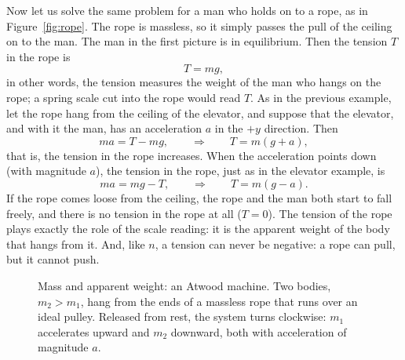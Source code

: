 \documentclass[11pt,a4paper]{article}
\begin{document}
Now let us solve the same problem for a man who holds on to a rope, as in Figure~\ref{fig:rope}.
The rope is massless, so it simply passes the pull of the ceiling on to the man. The man in the
first picture is in equilibrium. Then the tension $T$ in the rope is
\begin{equation}\label{eq:rope-rest}
  T = mg ,
\end{equation}
in other words, the tension measures the weight of the man who hangs on the rope; a spring scale
cut into the rope would read $T$. As in the previous example, let the rope hang from the ceiling of
the elevator, and suppose that the elevator, and with it the man, has an acceleration $a$ in the
$+y$ direction. Then
\begin{equation}\label{eq:rope-up}
  ma = T - mg , \qquad \Rightarrow \qquad T = m(g + a) ,
\end{equation}
that is, the tension in the rope increases. When the acceleration points down (with magnitude $a$),
the tension in the rope, just as in the elevator example, is
\begin{equation}\label{eq:rope-down}
  ma = mg - T , \qquad \Rightarrow \qquad T = m(g - a) .
\end{equation}
If the rope comes loose from the ceiling, the rope and the man both start to fall freely, and there
is no tension in the rope at all ($T = 0$). The tension of the rope plays exactly the role of the
scale reading: it is the apparent weight of the body that hangs from it. And, like $n$, a tension
can never be negative: a rope can pull, but it cannot push.

\begin{figure}[ht]
\centering
\begin{minipage}[c]{0.36\textwidth}
\centering
{}
\end{minipage}\hfill
\begin{minipage}[c]{0.6\textwidth}
\caption{Mass and apparent weight: an Atwood machine. Two bodies, $m_2 > m_1$, hang from the ends
of a massless rope that runs over an ideal pulley. Released from rest, the system turns clockwise:
$m_1$ accelerates upward and $m_2$ downward, both with acceleration of magnitude $a$.}
\label{fig:atwood}
\end{minipage}
\end{figure}
\end{document}
